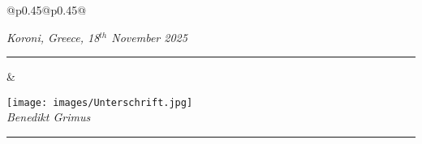 \noindent
\begin{tabular}{@{}p{0.45\textwidth}@{\hspace{0.1\textwidth}}p{0.45\textwidth}@{}}

\begin{minipage}[b]{\linewidth}
    \centering
    \textit{Koroni, Greece, 18$^{th}$ November 2025}\\[0.3cm]
    \rule{6cm}{0.4pt}
\end{minipage}
&
\begin{minipage}[b]{\linewidth}
    \centering
    \texttt{[image: images/Unterschrift.jpg]}\\[0.2cm]
    \textit{Benedikt Grimus}\\[0.3cm]
    \rule{6cm}{0.4pt}
\end{minipage}

\end{tabular}

